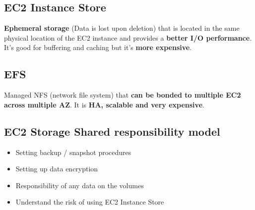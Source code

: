 \subsection{EC2 Instance Store}\label{subsec:ec2-instance-store}
\textbf{Ephemeral storage} (Data is lost upon deletion) that is located in the same physical location of the EC2 instance and provides a \textbf{better I/O performance}. It's good for buffering and caching but it's \textbf{more expensive}.

\subsection{EFS}\label{subsec:efs}
Managed NFS (network file system) that \textbf{can be bonded to multiple EC2 across multiple AZ}.
It is \textbf{HA, scalable and very expensive}.

\subsection{EC2 Storage Shared responsibility model}\label{subsec:ec2-storage-shared-responsibility-model}
\begin{itemize}
	\item{Setting backup / snapshot procedures}
	\item{Setting up data encryption}
	\item{Responsibility of any data on the volumes}
	\item{Understand the risk of using EC2 Instance Store}
\end{itemize}